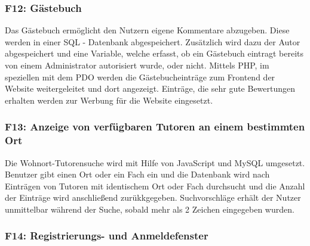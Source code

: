 \documentclass[10pt,a4paper]{scrartcl}
\begin{document}
\subsubsection*{F12: Gästebuch}

Das Gästebuch ermöglicht den Nutzern eigene Kommentare abzugeben. Diese werden in einer SQL - Datenbank abgespeichert. Zusätzlich wird dazu der Autor abgespeichert und eine Variable, welche erfasst, ob ein Gästebuch eintragt bereits von einem Administrator autorisiert wurde, oder nicht. Mittels PHP, im speziellen mit dem PDO werden die Gästebucheinträge zum Frontend der Website weitergeleitet und dort angezeigt. Einträge, die sehr gute Bewertungen erhalten werden zur Werbung für die Website eingesetzt.

\subsubsection*{F13: Anzeige von verfügbaren Tutoren an einem bestimmten Ort}

Die Wohnort-Tutorensuche wird mit Hilfe von JavaScript und MySQL umgesetzt. Benutzer gibt einen Ort oder ein Fach ein und die Datenbank wird nach Eintr\"agen von Tutoren mit identischem Ort oder Fach durchsucht und die Anzahl der Eintr\"age wird anschlie{\ss}end zur\"ukkgegeben.
Suchvorschläge erhält der Nutzer unmittelbar während der Suche, sobald mehr als
2 Zeichen eingegeben wurden.
%
%

\subsubsection*{F14: Registrierungs- und Anmeldefenster}
\end{document}

